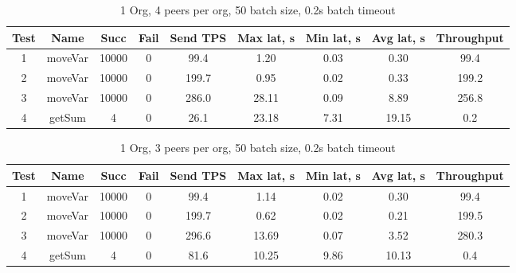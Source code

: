 \begin{appendices}
\begin{table}[h!]
\begin{center}
\begin{tabular}{ |c|c|c|c|c|c|c|c|c| }
 \hline
  Test & Name & Succ  & Fail & Send TPS & Max lat, s & Min lat, s & Avg lat, s & Throughput \\
 \hline
 \hline
 1    & moveVar & 10000 & 0    & 99.4  & 1.20      & 0.03      & 0.30      & 99.4 \\
 \hline
 2    & moveVar & 10000 & 0    & 199.7 & 0.95      & 0.02      & 0.33      & 199.2 \\
 \hline
 3    & moveVar & 10000 & 0    & 286.0 & 28.11     & 0.09      & 8.89      & 256.8 \\
 \hline
 4    & getSum  & 4     & 0    & 26.1  & 23.18     & 7.31      & 19.15     & 0.2 \\
 \hline
\end{tabular}
\end{center}
\caption{1 Org, 4 peers per org, 50 batch size, 0.2s batch timeout}
\end{table}

\begin{table}[h!]
\begin{center}
\begin{tabular}{ |c|c|c|c|c|c|c|c|c| }
 \hline
  Test & Name & Succ  & Fail & Send TPS & Max lat, s & Min lat, s & Avg lat, s & Throughput \\
 \hline
 \hline
 1    & moveVar & 10000 & 0    & 99.4  & 1.14      & 0.02      & 0.30      & 99.4  \\
 \hline
 2    & moveVar & 10000 & 0    & 199.7 & 0.62      & 0.02      & 0.21      & 199.5 \\
 \hline
 3    & moveVar & 10000 & 0    & 296.6 & 13.69     & 0.07      & 3.52      & 280.3 \\
 \hline
 4    & getSum  & 4     & 0    & 81.6  & 10.25     & 9.86      & 10.13     & 0.4   \\
 \hline
\end{tabular}
\end{center}
\caption{1 Org, 3 peers per org, 50 batch size, 0.2s batch timeout}
\end{table}


\end{appendices}
